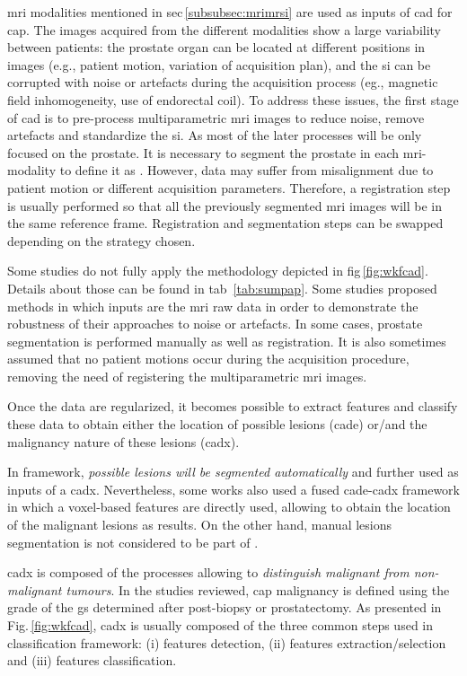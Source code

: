 \ac{mri} modalities mentioned in \acs{sec}\,\ref{subsubsec:mrimrsi} are used as inputs of \ac{cad} for \ac{cap}. The images acquired from the different modalities show a large variability between patients: the prostate organ can be located at different positions in images (e.g., patient motion, variation of acquisition plan), and the \ac{si} can be corrupted with noise or artefacts during the acquisition process (eg., magnetic field inhomogeneity, use of endorectal coil). To address these issues, the first stage of \ac{cad} is to pre-process multiparametric \ac{mri} images to reduce noise, remove artefacts and standardize the \ac{si}. As most of the later processes will be only focused on the prostate. It is necessary to segment the prostate in each \ac{mri}-modality to define it as . However, data may suffer from misalignment due to patient motion or different acquisition parameters. Therefore, a registration step is usually performed so that all the previously segmented \ac{mri} images will be in the same reference frame. Registration and segmentation steps can be swapped depending on the strategy chosen.

Some studies do not fully apply the methodology depicted in \acs{fig}\,\ref{fig:wkfcad}. Details about those can be found in \acs{tab}~\ref{tab:sumpap}. Some studies proposed methods in which inputs are the \ac{mri} raw data in order to demonstrate the robustness of their approaches to noise or artefacts. In some cases, prostate segmentation is performed manually as well as registration. It is also sometimes assumed that no patient motions occur during the acquisition procedure, removing the need of registering the multiparametric \ac{mri} images.

Once the data are regularized, it becomes possible to extract features and classify these data to obtain either the location of possible lesions (\ac{cade}) or/and the malignancy nature of these lesions (\ac{cadx}).

In  framework, \textit{possible lesions will be segmented automatically} and further used as inputs of a \ac{cadx}. Nevertheless, some works also used a fused \ac{cade}-\ac{cadx} framework in which a voxel-based features are directly used, allowing to obtain the location of the malignant lesions as results. On the other hand, manual lesions segmentation is not considered to be part of .

\Ac{cadx} is composed of the processes allowing to \textit{distinguish malignant from non-malignant tumours}. In the studies reviewed, \ac{cap} malignancy is defined using the grade of the \ac{gs} determined after post-biopsy or prostatectomy. As presented in Fig.\,\ref{fig:wkfcad}, \ac{cadx} is usually composed of the three common steps used in classification framework: (i) features detection, (ii) features extraction/selection and (iii) features classification.

